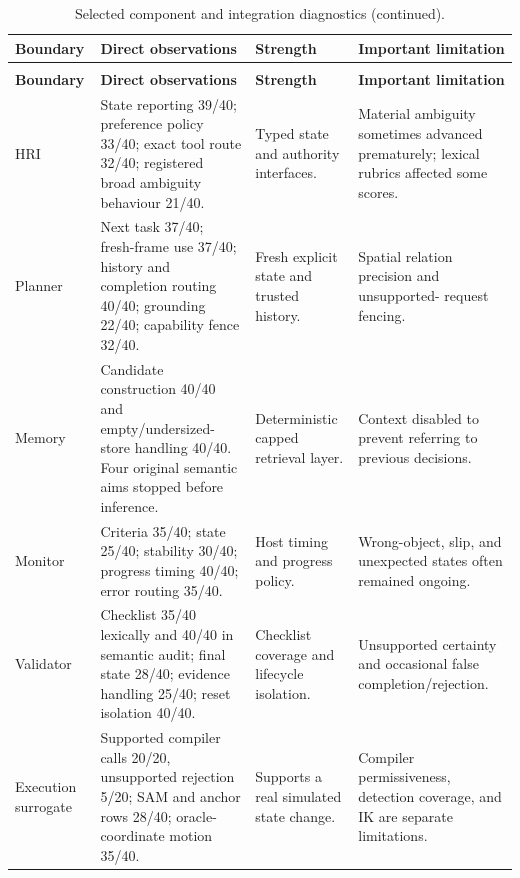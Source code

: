 \documentclass{article}
\begin{document}
{\footnotesize
\renewcommand{\arraystretch}{1.1}
\begin{longtable}{@{}P{2.05cm}P{6.00cm}P{3.15cm}P{3.45cm}@{}}
    \caption{Selected component and integration diagnostics.}
    \label{tab:app-component-diagnostics} \\
    \toprule
    \textbf{Boundary} & \textbf{Direct observations} & \textbf{Strength} &
    \textbf{Important limitation} \\
    \midrule
    \endfirsthead
    \caption[]{Selected component and integration diagnostics (continued).} \\
    \toprule
    \textbf{Boundary} & \textbf{Direct observations} & \textbf{Strength} &
    \textbf{Important limitation} \\
    \midrule
    \endhead
    \bottomrule
    \endlastfoot
    HRI & State reporting 39/40; preference policy 33/40; exact tool route 32/40;
    registered broad ambiguity behaviour 21/40. & Typed state and authority
    interfaces. & Material ambiguity sometimes advanced prematurely; lexical
    rubrics affected some scores. \\
    Planner & Next task 37/40; fresh-frame use 37/40; history and completion
    routing 40/40; grounding 22/40; capability fence 32/40. & Fresh explicit
    state and trusted history. & Spatial relation precision and unsupported-
    request fencing. \\
    Memory & Candidate construction 40/40 and empty/undersized-store handling
    40/40. Four original semantic aims stopped before inference. & Deterministic
    capped retrieval layer. & Context disabled to prevent referring to previous decisions. \\
    Monitor & Criteria 35/40; state 25/40; stability 30/40; progress timing 40/40;
    error routing 35/40. & Host timing and progress policy. & Wrong-object, slip,
    and unexpected states often remained ongoing. \\
    Validator & Checklist 35/40 lexically and 40/40 in semantic audit; final
    state 28/40; evidence handling 25/40; reset isolation 40/40. & Checklist
    coverage and lifecycle isolation. & Unsupported certainty and occasional
    false completion/rejection. \\
    Execution surrogate & Supported compiler calls 20/20, unsupported rejection
    5/20; SAM and anchor rows 28/40; oracle-coordinate motion 35/40. & Supports
    a real simulated state change. & Compiler permissiveness, detection coverage,
    and IK are separate limitations. \\
\end{longtable}
}
\end{document}
